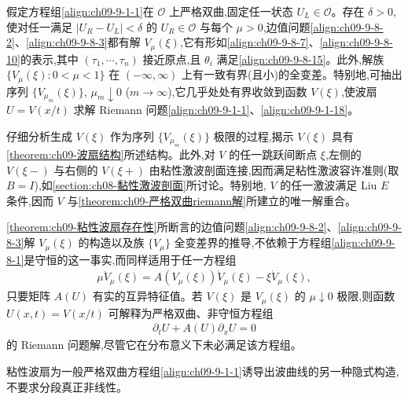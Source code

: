 \documentclass[../../main.tex]{subfiles}
\begin{document}
\begin{theorem}\label{theorem:ch09-粘性波扇存在性}
假定方程组\eqref{align:ch09-9-1-1}在 $\mathscr{O}$ 上严格双曲,固定任一状态 $U_{L}\in\mathscr{O}$。存在 $\delta>0$,使对任一满足 $|U_{R}-U_{L}|<\delta$ 的 $U_{R}\in\mathscr{O}$ 与每个 $\mu>0$,边值问题\eqref{align:ch09-9-8-2}、\eqref{align:ch09-9-8-3}都有解 $V_{\mu}(\xi)$,它有形如\eqref{align:ch09-9-8-7}、\eqref{align:ch09-9-8-10}的表示,其中 $(\tau_{1},\cdots ,\tau_{n})$ 接近原点,且 $\theta_{i}$ 满足\eqref{align:ch09-9-8-15}。此外,解族 $\{V_{\mu}(\xi):0<\mu<1\}$ 在 $(-\infty,\infty)$ 上有一致有界(且小)的全变差。特别地,可抽出序列 $\{V_{\mu_{m}}(\xi)\}$, $\mu_{m}\downarrow0$ ($m\to\infty$),它几乎处处有界收敛到函数 $V(\xi)$,使波扇 $U=V(x/t)$ 求解 Riemann 问题\eqref{align:ch09-9-1-1}、\eqref{align:ch09-9-1-18}。
\end{theorem}

仔细分析生成 $V(\xi)$ 作为序列 $\{V_{\mu_{m}}(\xi)\}$ 极限的过程,揭示 $V(\xi)$ 具有\cref{theorem:ch09-波扇结构}所述结构。此外,对 $V$ 的任一跳跃间断点 $\xi$,左侧的 $V(\xi-)$ 与右侧的 $V(\xi+)$ 由粘性激波剖面连接,因而满足粘性激波容许准则(取 $B=I$),如\cref{section:ch08-黏性激波剖面}所讨论。特别地, $V$ 的任一激波满足 Liu $E$ 条件,因而 $V$ 与\cref{theorem:ch09-严格双曲riemann解}所建立的唯一解重合。

\cref{theorem:ch09-粘性波扇存在性}所断言的边值问题\eqref{align:ch09-9-8-2}、\eqref{align:ch09-9-8-3}解 $V_{\mu}(\xi)$ 的构造以及族 $\{V_{\mu}\}$ 全变差界的推导,不依赖于方程组\eqref{align:ch09-9-8-1}是守恒的这一事实,而同样适用于任一方程组
\begin{align}
\mu\ddot{V}_{\mu}(\xi)=A(V_{\mu}(\xi))\dot{V}_{\mu}(\xi)-\xi\dot{V}_{\mu}(\xi),
\label{align:ch09-9-8-17}
\end{align}
只要矩阵 $A(U)$ 有实的互异特征值。若 $V(\xi)$ 是 $V_{\mu}(\xi)$ 的 $\mu\downarrow0$ 极限,则函数 $U(x,t)=V(x/t)$ 可解释为严格双曲、非守恒方程组
\begin{align}
\partial_{t}U+A(U)\partial_{x}U=0
\label{align:ch09-9-8-18}
\end{align}
的 Riemann 问题解,尽管它在分布意义下未必满足该方程组。

粘性波扇为一般严格双曲方程组\eqref{align:ch09-9-1-1}诱导出波曲线的另一种隐式构造,不要求分段真正非线性。
\end{document}
